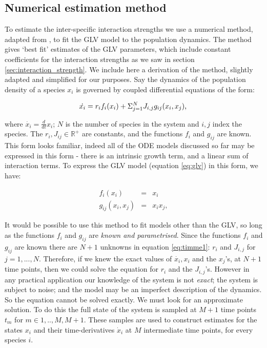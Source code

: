 \subsection{Numerical estimation method}
\label{sec:timme}


To estimate the inter-specific interaction strengths we use a numerical method, adapted from \cite{shandilya2011inferring}, to fit the GLV model to the population dynamics. The method gives `best fit' estimates of the GLV parameters, which include constant coefficients for the interaction strengths as we saw in section \ref{sec:interaction_strength}. We include here a derivation of the method, slightly adapted and simplified for our purposes. Say the dynamics of the population density of a species $x_i$ is governed by coupled differential equations of the form:

\begin{equation}\label{eq:timme1}
 \dot{x_i} = r_if_i(x_i) + \Sigma_{j=1}^{N}J_{i,j}g_{ij}(x_i,x_j),\\
\end{equation}

where $\dot{x_i} = \frac{d}{dt}x_{i}$; $N$ is the number of species in the system and $i,j$ index the species. The $r_i, J_{ij} \in \mathbb{R}^+$ are constants, and the functions $f_i$ and $g_{ij}$ are known. This form looks familiar, indeed all of the ODE models discussed so far may be expressed in this form - there is an intrinsic growth term, and a linear sum of interaction terms. To express the GLV model (equation \ref{eq:glv}) in this form, we have:

\begin{eqnarray}
f_i(x_i) &=& x_i \\
g_{ij}(x_i,x_j) &=& x_ix_j, 
\end{eqnarray}

It would be possible to use this method to fit models other than the GLV, so long as the functions $f_i$ and $g_{ij}$ are \emph{known and parametrised}. Since the functions $f_i$ and $g_{ij}$ are known there are $N+1$ unknowns in equation \ref{eq:timme1}: $r_i$ and $J_{i,j}$ for $j=1,...,N$. Therefore, if we knew the exact values of $\dot{x_i},x_i$ and the $x_j$'s, at $N+1$ time points, then we could solve the equation for $r_i$ and the $J_{i,j}$'s. However in any practical application our knowledge of the system is not \emph{exact}; the system is subject to noise; and the model may be an imperfect description of the dynamics. So the equation cannot be solved exactly. We must look for an approximate solution. To do this the full state of the system is sampled at $M+1$ time points $t_m$ for $m \in {1,..,M,M+1}$. These samples are used to construct estimates for the states $x_i$ and their time-derivatives $\dot{x}_i$ at $M$ intermediate time points, for every species $i$.

